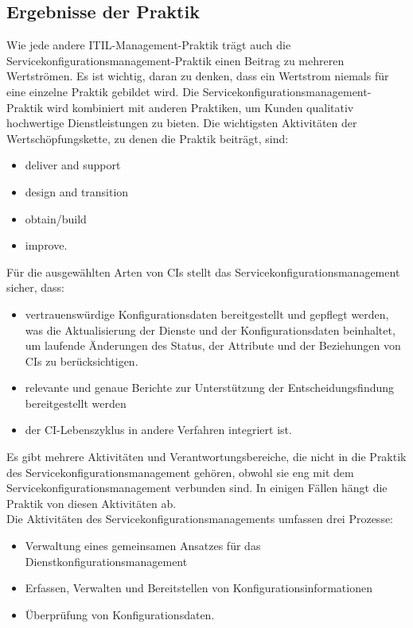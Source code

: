 \subsection{Ergebnisse der Praktik}
Wie jede andere ITIL-Management-Praktik trägt auch die Servicekonfigurationsmanagement-Praktik
einen Beitrag zu mehreren Wertströmen. Es ist wichtig, daran zu denken, dass ein Wertstrom niemals
für eine einzelne Praktik gebildet wird. Die Servicekonfigurationsmanagement-Praktik wird kombiniert mit anderen
Praktiken, um Kunden qualitativ hochwertige Dienstleistungen zu bieten. Die wichtigsten Aktivitäten der Wertschöpfungskette, zu denen
die Praktik beiträgt, sind:

\begin{itemize}
	\item deliver and support
	\item design and transition
	\item obtain/build
	\item improve.
\end{itemize}

\noindent
Für die ausgewählten Arten von CIs stellt das Servicekonfigurationsmanagement sicher, dass:

\begin{itemize}
	\item vertrauenswürdige Konfigurationsdaten bereitgestellt und gepflegt werden, was die Aktualisierung der Dienste und der Konfigurationsdaten beinhaltet, 
	um laufende Änderungen des Status, der Attribute und der Beziehungen von CIs zu berücksichtigen.
	\item relevante und genaue Berichte zur Unterstützung der Entscheidungsfindung bereitgestellt werden
	\item der CI-Lebenszyklus in andere Verfahren integriert ist.
\end{itemize}

\noindent
Es gibt mehrere Aktivitäten und Verantwortungsbereiche, die nicht in die Praktik 
des Servicekonfigurationsmanagement gehören, obwohl sie eng mit dem Servicekonfigurationsmanagement verbunden sind.
In einigen Fällen hängt die Praktik von diesen Aktivitäten ab. \\

\noindent
Die Aktivitäten des Servicekonfigurationsmanagements umfassen drei Prozesse:

\begin{itemize}
	\item Verwaltung eines gemeinsamen Ansatzes für das Dienstkonfigurationsmanagement
	\item Erfassen, Verwalten und Bereitstellen von Konfigurationsinformationen
	\item Überprüfung von Konfigurationsdaten.
\end{itemize}


